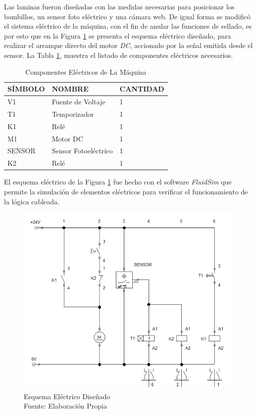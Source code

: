 \vspace{1cm}

Las laminas fueron diseñadas con las medidas necesarias para posicionar los  bombillos, un sensor foto eléctrico y una cámara web. De igual forma se modificó el sistema eléctrico de la máquina, con el fin de anular las funciones de sellado, es por esto que en la Figura \ref{fig:Esquema} se presenta el esquema eléctrico diseñado, para realizar el arranque directo del motor \textit{DC}, accionado por la señal emitida desde el sensor. La Tabla \ref{table:esquema}, muestra el listado de componentes eléctricos necesarios.
 
 \newpage
 \begin{table}[ht]
 	\centering
 	\resizebox{10cm}{!} { 	
 	\begin{tabular}{|p{2cm}|p{5cm}|p{3cm}|}
 		\hline
 		SÍMBOLO & NOMBRE & CANTIDAD \\ 
 		\hline
 		V1 & Fuente de Voltaje & 1 \\
 		\hline
 		T1 & Temporizador & 1 \\
 		\hline
 		K1 & Relé & 1 \\
 		\hline
 		M1 & Motor DC & 1 \\
 		\hline
 		SENSOR & Sensor Fotoeléctrico & 1 \\
 		\hline
 		K2 & Relé & 1 \\
 		\hline
 	\end{tabular}
	}
 	\caption{Componentes Eléctricos de La Máquina}
 	\label{table:esquema}
 \end{table}	
 
El esquema eléctrico de la Figura \ref{fig:Esquema} fue hecho con el software \textit{FluidSim} que permite la simulación de elementos eléctricos para verificar el funcionamiento de la lógica cableada.

\begin{figure}[ht]
	\centering
	\includegraphics[scale=0.5]{Figs/66.png}
	\caption{Esquema Eléctrico Diseñado\\Fuente: Elaboración Propia}
	\label{fig:Esquema}
\end{figure}



